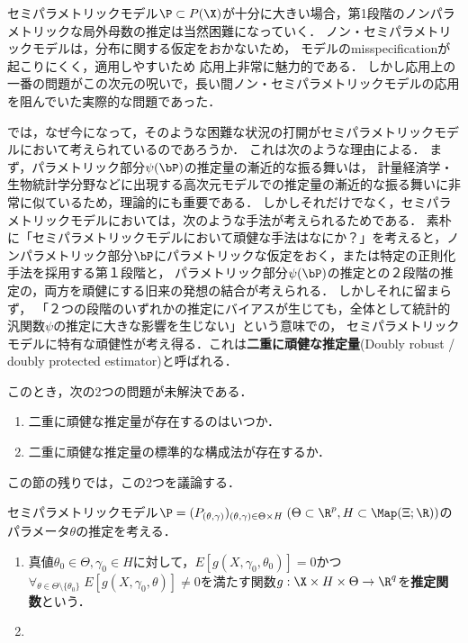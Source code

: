 \documentclass[uplatex, dvipdfmx]{jsarticle}
\begin{document}
\begin{context}
    セミパラメトリックモデル$\P\subset P(\X)$が十分に大きい場合，第1段階のノンパラメトリックな局外母数の推定は当然困難になっていく．
    ノン・セミパラメトリックモデルは，分布に関する仮定をおかないため，
    モデルのmisspecificationが起こりにくく，適用しやすいため
    応用上非常に魅力的である．
    しかし応用上の一番の問題がこの次元の呪いで，長い間ノン・セミパラメトリックモデルの応用を阻んでいた実際的な問題であった．

    では，なぜ今になって，そのような困難な状況の打開がセミパラメトリックモデルにおいて考えられているのであろうか．
    これは次のような理由による．
    まず，パラメトリック部分$\psi(\bP)$の推定量の漸近的な振る舞いは，
    計量経済学・生物統計学分野などに出現する高次元モデルでの推定量の漸近的な振る舞いに非常に似ている\cite{Robins and Ritov}ため，理論的にも重要である．
    しかしそれだけでなく，セミパラメトリックモデルにおいては，次のような手法が考えられるためである．
    素朴に「セミパラメトリックモデルにおいて頑健な手法はなにか？」を考えると，ノンパラメトリック部分$\bP$にパラメトリックな仮定をおく，または特定の正則化手法を採用する第１段階と，
    パラメトリック部分$\psi(\bP)$の推定との２段階の推定の，両方を頑健にする旧来の発想の結合が考えられる．
    しかしそれに留まらず，
    「２つの段階のいずれかの推定にバイアスが生じても，全体として統計的汎関数$\psi$の推定に大きな影響を生じない」という意味での，
    セミパラメトリックモデルに特有な頑健性が考え得る．これは\textbf{二重に頑健な推定量}(Doubly robust / doubly protected estimator)と呼ばれる．

    このとき，次の2つの問題が未解決である．
    \begin{enumerate}
        \item 二重に頑健な推定量が存在するのはいつか．
        \item 二重に頑健な推定量の標準的な構成法が存在するか．
    \end{enumerate}
    この節の残りでは，この2つを議論する．
\end{context}

\begin{definition}
    セミパラメトリックモデル$\P=(P_{(\theta,\gamma)})_{(\theta,\gamma)\in\Theta\times H}\;(\Theta\subset\R^p,H\subset\Map(\Xi;\R))$のパラメータ$\theta$の推定を考える．
    \begin{enumerate}
        \item 真値$\theta_0\in\Theta,\gamma_0\in H$に対して，$E[g(X,\gamma_0,\theta_0)]=0$かつ$\forall_{\theta\in\Theta\setminus\{\theta_0\}}\;E[g(X,\gamma_0,\theta)]\ne 0$を満たす関数$g:\X\times H\times\Theta\to\R^q$を\textbf{推定関数}という．
        \item 
    \end{enumerate}
\end{definition}
\end{document}
